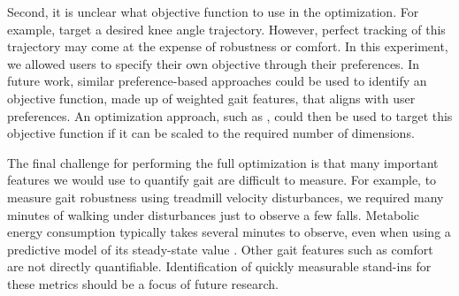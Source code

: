 Second, it is unclear what objective function to use in the optimization. For
example, \citet{wen2019online} target a desired knee angle trajectory. However,
perfect tracking of this trajectory may come at the expense of robustness or
comfort. In this experiment, we allowed users to specify their own objective
through their preferences. In future work, similar preference-based approaches
could be used to identify an objective function, made up of weighted gait
features, that aligns with user preferences.  An optimization approach, such as
\citet{wen2019online}, could then be used to target this objective function if
it can be scaled to the required number of dimensions.

The final challenge for performing the full optimization is that many important
features we would use to quantify gait are difficult to measure. For example, to
measure gait robustness using treadmill velocity disturbances, we required many
minutes of walking under disturbances just to observe a few falls. Metabolic
energy consumption typically takes several minutes to observe, even when using a
predictive model of its steady-state value \citep{zhang2017human}. Other gait
features such as comfort are not directly quantifiable. Identification of
quickly measurable stand-ins for these metrics should be a focus of future
research.
